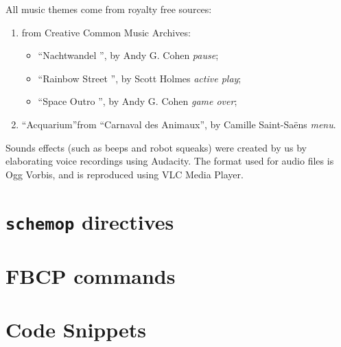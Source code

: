 \documentclass[a4paper,twoside]{book}
\begin{document}
\begin{appendices}
All music themes come from royalty free sources:
\begin{enumerate}
\item from Creative Common Music Archives:
\begin{itemize}
\item\textquotedblleft Nachtwandel \textquotedblright, by Andy G. Cohen \textemdash  \textit{pause};
\item\textquotedblleft Rainbow Street \textquotedblright, by Scott Holmes \textemdash \textit{active play};
\item\textquotedblleft Space Outro \textquotedblright, by Andy G. Cohen \textemdash \textit{game over};
\end{itemize}
\item \textquotedblleft Acquarium\textquotedblright from \textquotedblleft Carnaval des Animaux\textquotedblright, by Camille Saint-Sa\"ens  \textemdash \textit{menu}.
\end{enumerate}
Sounds effects (such as beeps and robot squeaks) were created by us by elaborating voice recordings using Audacity. 
The format used for audio files is Ogg Vorbis, and is reproduced using VLC Media Player.

\chapter{\texttt{schemop} directives}
\label{app:schemop}


\chapter{FBCP commands}
\label{app:fbcp}


\chapter{Code Snippets}
\label{app:code}


\end{appendices}



\end{document}
